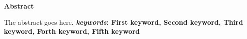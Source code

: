 \begin{latin} 
	\begin{center} 
		\Large{\textbf{Abstract}} \\ \end{center} 
	\linespread{1.4}
	\small	
The abstract goes here. 
	\newline 
	\textbf{\textit{keywords}: First keyword, Second keyword, Third keyword, Forth keyword, Fifth keyword} 
	\normalsize	
\end{latin} 